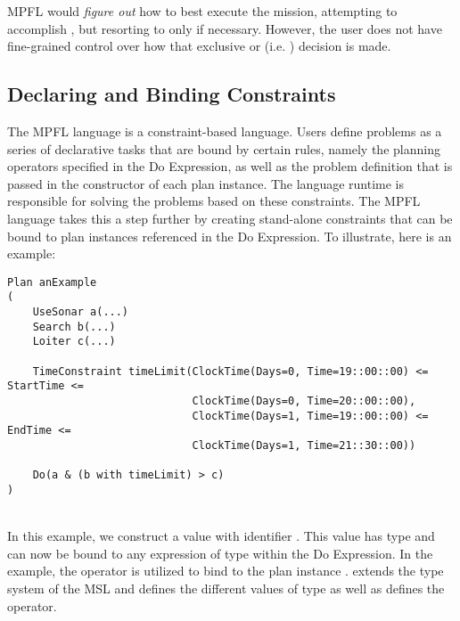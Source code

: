 \begin{flushleft}
MPFL would \emph{figure out} how to best execute the mission, attempting to accomplish , but resorting to  only if necessary. However, the user does not have fine-grained control over how that exclusive or (i.e. ) decision is made.
\end{flushleft}

\subsection{Declaring and Binding Constraints}
The MPFL language is a constraint-based language. Users define problems as a series of declarative tasks that are bound by certain rules, namely the planning operators specified in the Do Expression, as well as the problem definition that is passed in the constructor of each plan instance. The language runtime is responsible for solving the problems based on these constraints. The MPFL language takes this a step further by creating stand-alone constraints that can be bound to plan instances referenced in the Do Expression. To illustrate, here is an example:

\begin{verbatim}
Plan anExample
(
    UseSonar a(...)
    Search b(...)
    Loiter c(...)

    TimeConstraint timeLimit(ClockTime(Days=0, Time=19::00::00) <= StartTime <= 
	                         ClockTime(Days=0, Time=20::00::00), 
	                         ClockTime(Days=1, Time=19::00::00) <= EndTime <= 
	                         ClockTime(Days=1, Time=21::30::00))
	                         
    Do(a & (b with timeLimit) > c)
)
\end{verbatim}
\\

In this example, we construct a  value with identifier . This value has type  and can now be bound to any expression of type  within the Do Expression. In the example, the operator  is utilized to bind  to the plan instance .  extends the type system of the MSL and defines the different values of type  as well as defines the  operator.

